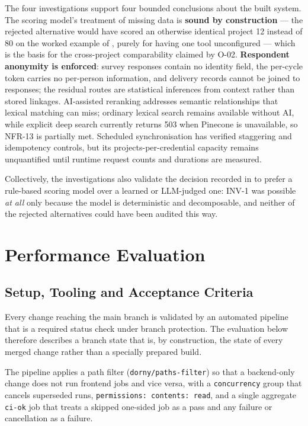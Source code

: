 The four investigations support four bounded conclusions about the built system.
The scoring model's treatment of missing data is \textbf{sound by
construction} --- the rejected alternative would have scored an otherwise
identical project 12 instead of 80 on the worked example of ,
purely for having one tool unconfigured --- which is the basis for the
cross-project comparability claimed by O-02. \textbf{Respondent anonymity is
enforced}: survey responses contain no identity field, the per-cycle token
carries no per-person information, and delivery records cannot be joined to
responses; the residual routes are statistical inferences from context rather
than stored linkages. AI-assisted reranking addresses semantic relationships
that lexical matching can miss; ordinary lexical search remains available
without AI, while explicit deep search currently returns 503 when Pinecone is
unavailable, so NFR-13 is partially met. Scheduled synchronisation has verified
staggering and idempotency controls, but its projects-per-credential capacity
remains unquantified until runtime request counts and durations are measured.

Collectively, the investigations also validate the decision recorded in
 to prefer a rule-based scoring model over a learned or
LLM-judged one: INV-1 was possible \emph{at all} only because the model is
deterministic and decomposable, and neither of the rejected alternatives could
have been audited this way.

\section{Performance Evaluation}
\label{sec:performance}

\subsection{Setup, Tooling and Acceptance Criteria}
\label{subsec:eval-setup}

Every change reaching the main branch is validated by an automated pipeline that
is a required status check under branch protection. The evaluation below
therefore describes a branch state that is, by construction, the state of every
merged change rather than a specially prepared build.

The pipeline applies a path filter (\texttt{dorny/paths-filter}) so that a
backend-only change does not run frontend jobs and vice versa, with a
\texttt{concurrency} group that cancels superseded runs,
\texttt{permissions: contents: read}, and a single aggregate \texttt{ci-ok} job
that treats a skipped one-sided job as a pass and any failure or cancellation as
a failure.


